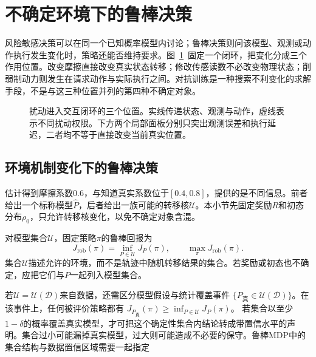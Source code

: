 \section{不确定环境下的鲁棒决策}
\label{sec:rl-trustworthy-robust}

风险敏感决策可以在同一个已知概率模型内讨论；鲁棒决策则问该模型、观测或动作执行发生变化时，策略还能否维持要求。图~\ref{fig:rl-trustworthy-channels}~固定一个闭环，把变化分成三个作用位置。改变摩擦直接改变真实状态转移；修改传感读数不必改变物理状态；削弱制动力则发生在请求动作与实际执行之间。对抗训练是一种搜索不利变化的求解手段，不是与这三种位置并列的第四种不确定对象。

\begin{figure}[t]
  \centering
  
  \caption{扰动进入交互闭环的三个位置。实线传递状态、观测与动作，虚线表示不同扰动权限。下方两个局部面板分别只突出观测误差和执行延迟，二者均不等于直接改变当前真实位置。}
  \label{fig:rl-trustworthy-channels}
\end{figure}

\subsection{环境机制变化下的鲁棒决策}
\label{sec:rl-trustworthy-mechanism}

估计得到摩擦系数0.6，与知道真实系数位于$[0.4,0.8]$，提供的是不同信息。前者给出一个标称模型$\widehat P$，后者给出一族可能的转移核$\mathcal U$。本小节先固定奖励$R$和初态分布$\rho_0$，只允许转移核变化，以免不确定对象含混。

\begin{definition}[最坏情形回报]
  \label{def:rl-trustworthy-robust-return}
  对模型集合$\mathcal U$，固定策略$\pi$的鲁棒回报为
  \[
    J_{\mathrm{rob}}(\pi)=\inf_{P\in\mathcal U}J_P(\pi),
    \qquad \max_\pi J_{\mathrm{rob}}(\pi).
  \]
  集合$\mathcal U$描述允许的环境，而不是轨迹中随机转移结果的集合。若奖励或初态也不确定，应把它们与$P$一起列入模型集合。
\end{definition}

若$\mathcal U=\mathcal U(\mathcal D)$来自数据，还需区分模型假设与统计覆盖事件
$\{P_{\text{真}}\in\mathcal U(\mathcal D)\}$。在该事件上，任何被评价策略都有
$J_{P_{\text{真}}}(\pi)\geq\inf_{P\in\mathcal U}J_P(\pi)$。
若集合以至少$1-\delta$的概率覆盖真实模型，才可把这个确定性集合内结论转成带置信水平的声明。集合过小可能漏掉真实模型，过大则可能造成不必要的保守。鲁棒MDP中的集合结构与数据置信区域需要一起指定


